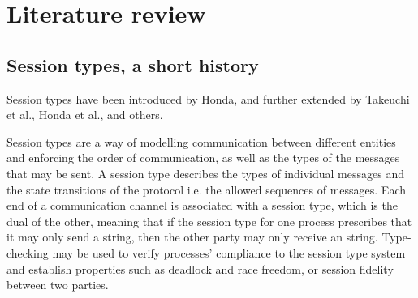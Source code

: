 \section{Literature review}
\label{litreview}


\subsection{Session types, a short history}
\label{st}


Session types have been introduced by Honda\cite{honda93}, and further extended by Takeuchi et al.\cite{tk94}, Honda et al.\cite{honda98}, and others. 



Session types are a way of modelling communication between different entities and enforcing the order of communication, as well as the types of the messages that may be sent. A session type describes the types of individual messages and the state transitions of the protocol i.e. the allowed sequences of messages. Each end of a communication channel is associated with a session type, which is the dual of the other, meaning that if the session type for one process prescribes that it may only send a string, then the other party may only receive an string. Type-checking may be used to verify processes’ compliance to the session type system and establish properties such as deadlock and race freedom, or session fidelity between two parties.



